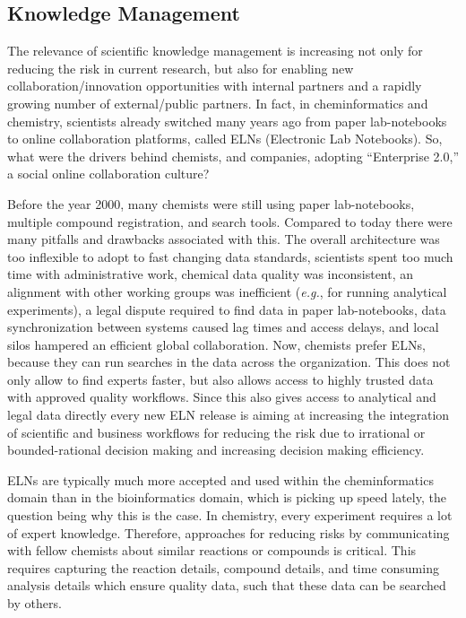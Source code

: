 \documentclass{sig-alternate}
\begin{document}
\subsection{Knowledge Management}
\label{sec:knowledge-management}

The relevance of scientific knowledge management is increasing not
only for reducing the risk in current research, but also for enabling
new collaboration/innovation opportunities with internal partners and
a rapidly growing number of external/public partners. In fact, in
cheminformatics and chemistry, scientists already switched many years
ago from paper lab-notebooks to online collaboration platforms, called
ELNs (Electronic Lab Notebooks). So, what were the drivers behind
chemists, and companies, adopting ``Enterprise 2.0,'' a social online
collaboration culture?

Before the year 2000, many chemists were still using paper
lab-notebooks, multiple compound registration, and search
tools. Compared to today there were many pitfalls and drawbacks
associated with this. The overall architecture was too inflexible to
adopt to fast changing data standards, scientists spent too much time
with administrative work, chemical data quality was inconsistent, an
alignment with other working groups was inefficient (\emph{e.g.}, for
running analytical experiments), a legal dispute required to find data
in paper lab-notebooks, data synchronization between systems caused
lag times and access delays, and local silos hampered an efficient
global collaboration. Now, chemists prefer ELNs, because they can run
searches in the data across the organization. This does not only allow
to find experts faster, but also allows access to highly trusted data
with approved quality workflows. Since this also gives access to
analytical and legal data directly every new ELN release is aiming at
increasing the integration of scientific and business workflows for
reducing the risk due to irrational or bounded-rational decision
making and increasing decision making efficiency.

ELNs are typically much more accepted and used within the
cheminformatics domain than in the bioinformatics domain, which is
picking up speed lately, the question being why this is the case. In
chemistry, every experiment requires a lot of expert
knowledge. Therefore, approaches for reducing risks by communicating
with fellow chemists about similar reactions or compounds is
critical. This requires capturing the reaction details, compound
details, and time consuming analysis details which ensure quality
data, such that these data can be searched by others.
\end{document}
